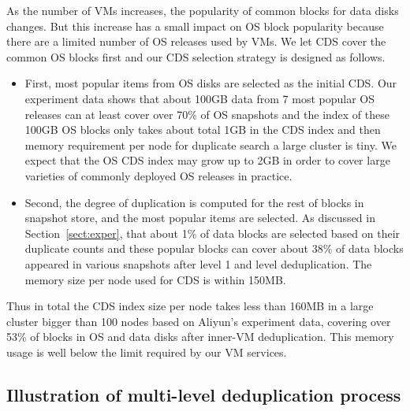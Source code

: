 As the number of VMs increases, the popularity of common blocks for data disks changes.
But this increase has a small impact on OS block popularity because 
there are a limited number of OS releases used by VMs. We let CDS cover the common OS blocks first and
our CDS selection strategy is designed as follows.
\begin{itemize}
\item First, most popular items from OS disks are selected as the initial CDS.
Our experiment data shows that about 
100GB data from 7 most popular OS releases
can at least cover over 70\% of OS snapshots and the index of these 100GB OS blocks
only takes about total 1GB in the CDS index and then memory requirement per node 
for duplicate search a large cluster is tiny.
We expect that the OS CDS index may grow up to 2GB in order to cover large varieties  of commonly deployed
OS releases in practice.
\item Second, the degree of duplication is computed for the rest of blocks in snapshot store, and
the  most popular items are selected. As discussed in Section~\ref{sect:exper}, 
that about 1\% of data blocks are selected based on their duplicate counts and these popular blocks
can cover about 38\% of data  blocks appeared in various snapshots after level 1 and level deduplication.  
The memory size per node used for CDS is within 150MB.
\end{itemize}
Thus in total the CDS index size per node takes less than 160MB in a large cluster bigger than 100 nodes based on
Aliyun's experiment data, covering over 53\% of blocks in OS and data disks after inner-VM deduplication.
This memory usage is well below the limit required by our VM services.

\subsection{Illustration  of multi-level deduplication process}



